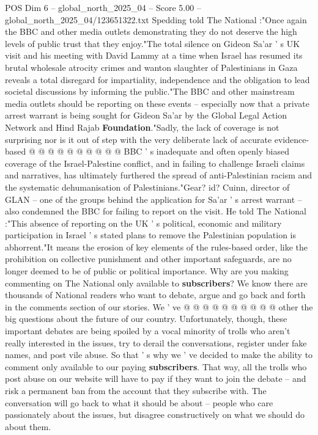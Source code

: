 \begin{textsample}{POS Dim 6 – global\_north\_2025\_04 – Score 5.00 – global\_north\_2025\_04/123651322.txt}
Spedding told The National :"Once again the BBC and other media outlets demonstrating they do not deserve the high levels of public trust that they enjoy."The total silence on Gideon Sa'ar ' s UK visit and his meeting with David Lammy at a time when Israel has resumed its brutal wholesale atrocity crimes and wanton slaughter of Palestinians in Gaza reveals a total disregard for impartiality, independence and the obligation to lead societal discussions by informing the public."The BBC and other mainstream media outlets should be reporting on these events -- especially now that a private arrest warrant is being sought for Gideon Sa'ar by the Global Legal Action Network and Hind Rajab \textbf{Foundation}."Sadly, the lack of coverage is not surprising nor is it out of step with the very deliberate lack of accurate evidence-based @ @ @ @ @ @ @ @ @ @ BBC ' s inadequate and often openly biased coverage of the Israel-Palestine conflict, and in failing to challenge Israeli claims and narratives, has ultimately furthered the spread of anti-Palestinian racism and the systematic dehumanisation of Palestinians."Gear? id?
Cuinn, director of GLAN -- one of the groups behind the application for Sa'ar ' s arrest warrant -- also condemned the BBC for failing to report on the visit.
He told The National :"This absence of reporting on the UK ' s political, economic and military participation in Israel ' s stated plans to remove the Palestinian population is abhorrent."It means the erosion of key elements of the rules-based order, like the prohibition on collective punishment and other important safeguards, are no longer deemed to be of public or political importance.
Why are you making commenting on The National only available to \textbf{subscribers}?
We know there are thousands of National readers who want to debate, argue and go back and forth in the comments section of our stories.
We ' ve @ @ @ @ @ @ @ @ @ @ other the big questions about the future of our country.
Unfortunately, though, these important debates are being spoiled by a vocal minority of trolls who aren't really interested in the issues, try to derail the conversations, register under fake names, and post vile abuse.
So that ' s why we ' ve decided to make the ability to comment only available to our paying \textbf{subscribers}.
That way, all the trolls who post abuse on our website will have to pay if they want to join the debate -- and risk a permanent ban from the account that they subscribe with.
The conversation will go back to what it should be about -- people who care passionately about the issues, but disagree constructively on what we should do about them.

\end{textsample}
